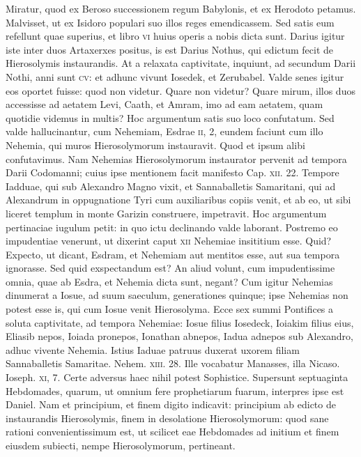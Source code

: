 \begin{parnumbers}
{}
\lnr{}Miratur, quod ex Beroso successionem regum Babylonis, et
ex Herodoto petamus. Malvisset, ut ex Isidoro populari suo illos
reges emendicassem.
\lnr{}Sed satis eum refellunt quae superius, et libro
\textsc{vi} huius operis a nobis dicta sunt.
\lnr{}Darius igitur iste inter duos Artaxerxes
positus, is est Darius Nothus, qui edictum fecit de Hierosolymis
instaurandis.
\lnr{}At a relaxata captivitate, inquiunt, ad secundum
Darii Nothi, anni sunt \textsc{cv}: et adhunc vivunt Iosedek, et Zerubabel.
\lnr{}Valde senes igitur eos oportet fuisse: quod non videtur.
\lnr{}Quare non videtur?
\lnr{}Quare mirum, illos duos accessisse ad aetatem
Levi, Caath, et Amram, imo ad eam aetatem, quam quotidie videmus
in multis?
\lnr{}Hoc argumentum satis suo loco confutatum.
\lnr{}Sed
valde hallucinantur, cum Nehemiam, Esdrae \textsc{ii}, 2, eundem faciunt
cum illo Nehemia, qui muros Hierosolymorum instauravit.
\lnr{}Quod et ipsum alibi confutavimus.
\lnr{}Nam Nehemias Hierosolymorum
instaurator pervenit ad tempora Darii Codomanni;
cuius ipse mentionem facit manifesto Cap. \textsc{xii}. 22.
\lnr{}Tempore Iadduae,
qui sub Alexandro Magno vixit, et Sannaballetis Samaritani,
qui ad Alexandrum in oppugnatione Tyri cum auxiliaribus
copiis venit, et ab eo, ut sibi liceret templum in monte Garizin
construere, impetravit.
\lnr{}Hoc argumentum pertinaciae iugulum
petit: in quo ictu declinando valde laborant.
\lnr{}Postremo
eo impudentiae venerunt, ut dixerint caput \textsc{xii} Nehemiae insititium
esse.
\lnr{}Quid?
\lnr{}Expecto, ut dicant, Esdram, et Nehemiam aut
mentitos esse, aut sua tempora ignorasse.
\lnr{}Sed quid exspectandum
est?
\lnr{}An aliud volunt, cum impudentissime omnia, quae ab Esdra,
et Nehemia dicta sunt, negant?
\lnr{}Cum igitur Nehemias dinumerat
a Iosue, ad suum saeculum, generationes quinque; ipse
Nehemias non potest esse is, qui cum Iosue venit Hierosolyma.
\lnr{}Ecce sex summi Pontifices a soluta captivitate, ad tempora Nehemiae:
Iosue filius Iosedeck, Ioiakim filius eius, Eliasib nepos,
Ioiada pronepos, Ionathan abnepos, Iadua adnepos sub Alexandro,
adhuc vivente Nehemia.
\lnr{}Istius Iaduae patruus duxerat uxorem
filiam Sannaballetis Samaritae.
\lnr{}Nehem. \textsc{xiii}. 28.
\lnr{}Ille vocabatur
Manasses, illa Nicaso.
\lnr{}Ioseph. \textsc{xi}, 7.
\lnr{}Certe adversus haec
nihil potest Sophistice.
\lnr{}Supersunt septuaginta Hebdomades, quarum,
ut omnium fere prophetiarum fuarum, interpres ipse est Daniel.
\lnr{}Nam et principium, et finem digito indicavit: principium ab
edicto de instaurandis Hierosolymis, finem in desolatione Hierosolymorum:
quod sane rationi convenientissimum est, ut scilicet eae
Hebdomades ad initium et finem eiusdem subiecti, nempe Hierosolymorum,
pertineant.


\end{parnumbers}
